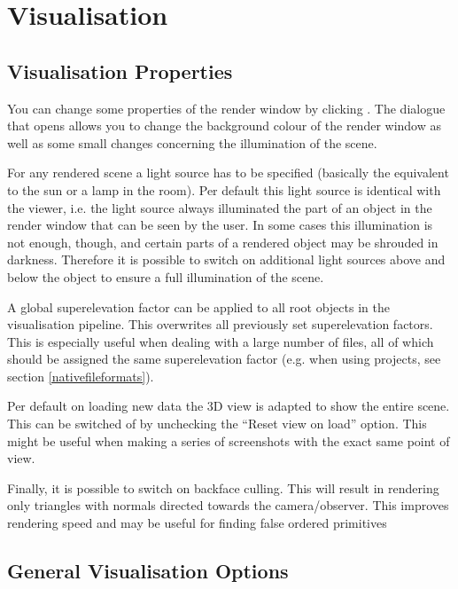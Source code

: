 \chapter{Visualisation}

\section{Visualisation Properties}

You can change some properties of the render window by clicking  . The dialogue that opens allows you to change the background colour of the render window as well as some small changes concerning the illumination of the scene.

For any rendered scene a light source has to be specified (basically the equivalent to the sun or a lamp in the room). Per default this light source is identical with the viewer, i.e. the light source always illuminated the part of an object in the render window that can be seen by the user. In some cases this illumination is not enough, though, and certain parts of a rendered object may be shrouded in darkness. Therefore it is possible to switch on additional light sources above and below the object to ensure a full illumination of the scene.

A global superelevation factor can be applied to all root objects in the visualisation pipeline. This overwrites all previously set superelevation factors. This is especially useful when dealing with a large number of files, all of which should be assigned the same superelevation factor (e.g. when using \ogs projects, see section \ref{nativefileformats}).

Per default on loading new data the 3D view is adapted to show the entire scene. This can be switched of by unchecking the ``Reset view on load'' option. This might be useful when making a series of screenshots with the exact same point of view.

Finally, it is possible to switch on backface culling. This will result in rendering only triangles with normals directed towards the camera/observer. This improves rendering speed and may be useful for finding false ordered primitives
\section{General Visualisation Options}
\label{genvisoptions}

